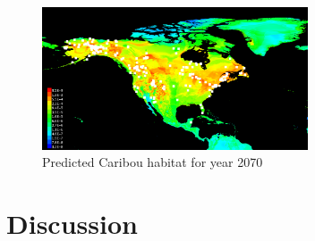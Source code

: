 \documentclass[twoside]{article}
\begin{document}
\begin{figure}[h!]
\centering
\includegraphics[width=0.7\textwidth]{NCaribouFuture}
\caption{Predicted Caribou habitat for year 2070}
\end{figure}

\section{Discussion}

\small



\end{document}
